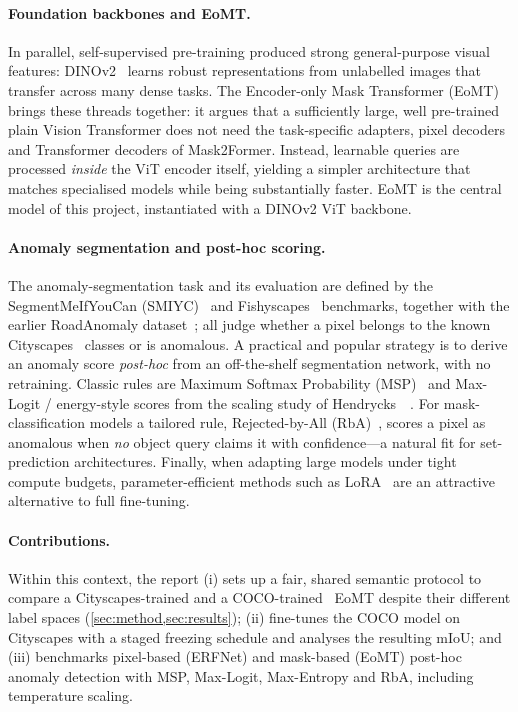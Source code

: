 \paragraph{Foundation backbones and EoMT.}
In parallel, self-supervised pre-training produced strong general-purpose
visual features: DINOv2~\cite{dinov2} learns robust representations from
unlabelled images that transfer across many dense tasks. The Encoder-only
Mask Transformer (EoMT)~\cite{eomt} brings these threads together: it argues
that a sufficiently large, well pre-trained plain Vision Transformer does not
need the task-specific adapters, pixel decoders and Transformer decoders of
Mask2Former. Instead, learnable queries are processed \emph{inside} the ViT
encoder itself, yielding a simpler architecture that matches specialised
models while being substantially faster. EoMT is the central model of this
project, instantiated with a DINOv2 ViT backbone.

\paragraph{Anomaly segmentation and post-hoc scoring.}
The anomaly-segmentation task and its evaluation are defined by the
SegmentMeIfYouCan (SMIYC)~\cite{smiyc} and Fishyscapes~\cite{fishyscapes}
benchmarks, together with the earlier RoadAnomaly dataset~\cite{roadanomaly};
all judge whether a pixel belongs to the known Cityscapes~\cite{cityscapes}
classes or is anomalous. A practical and popular strategy is to derive an
anomaly score \emph{post-hoc} from an off-the-shelf segmentation network,
with no retraining. Classic rules are Maximum Softmax Probability
(MSP)~\cite{msp} and Max-Logit / energy-style scores from the scaling study
of Hendrycks~\etal~\cite{maxlogit}. For mask-classification models a tailored
rule, Rejected-by-All (RbA)~\cite{rba}, scores a pixel as anomalous when
\emph{no} object query claims it with confidence---a natural fit for
set-prediction architectures. Finally, when adapting large models under tight
compute budgets, parameter-efficient methods such as LoRA~\cite{lora} are an
attractive alternative to full fine-tuning.

\paragraph{Contributions.}
Within this context, the report (i) sets up a fair, shared semantic protocol
to compare a Cityscapes-trained and a COCO-trained~\cite{coco} EoMT despite
their different label spaces (\cref{sec:method,sec:results}); (ii) fine-tunes
the COCO model on Cityscapes with a staged freezing schedule and analyses the
resulting mIoU; and (iii) benchmarks pixel-based (ERFNet) and mask-based
(EoMT) post-hoc anomaly detection with MSP, Max-Logit, Max-Entropy and RbA,
including temperature scaling.
